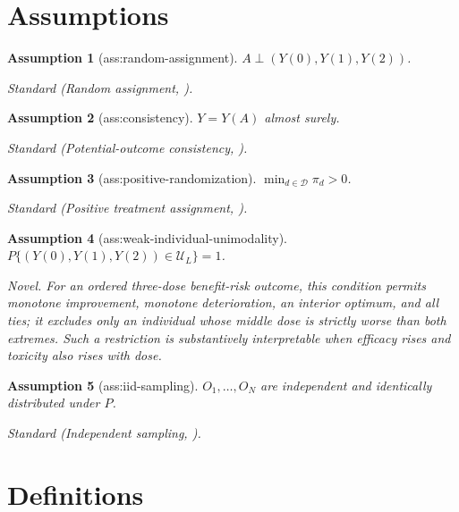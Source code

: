 \documentclass{article}
\newtheorem{assumption}{Assumption}
\begin{document}
\section{Assumptions}

\begin{assumption}[ass:random-assignment]\label{ass:random-assignment}
\(A\perp (Y(0),Y(1),Y(2))\).
\par\smallskip\noindent\emph{Standard} (Random assignment, \cite{GoodwinEtAl2022}).
\end{assumption}

\begin{assumption}[ass:consistency]\label{ass:consistency}
\(Y=Y(A)\) almost surely.
\par\smallskip\noindent\emph{Standard} (Potential-outcome consistency, \cite{LuDingDasgupta2018}).
\end{assumption}

\begin{assumption}[ass:positive-randomization]\label{ass:positive-randomization}
\(\min_{d\in\mathcal D}\pi_d>0\).
\par\smallskip\noindent\emph{Standard} (Positive treatment assignment, \cite{GoodwinEtAl2022}).
\end{assumption}

\begin{assumption}[ass:weak-individual-unimodality]\label{ass:weak-individual-unimodality}
\(P\{(Y(0),Y(1),Y(2))\in\mathcal U_L\}=1\).
\par\smallskip\noindent\emph{Novel.} For an ordered three-dose benefit-risk outcome, this condition permits monotone improvement, monotone deterioration, an interior optimum, and all ties; it excludes only an individual whose middle dose is strictly worse than both extremes. Such a restriction is substantively interpretable when efficacy rises and toxicity also rises with dose.
\end{assumption}

\begin{assumption}[ass:iid-sampling]\label{ass:iid-sampling}
\(O_1,\ldots,O_N\) are independent and identically distributed under \(P\).
\par\smallskip\noindent\emph{Standard} (Independent sampling, \cite{ChoRussell2024}).
\end{assumption}

\section{Definitions}
\end{document}
